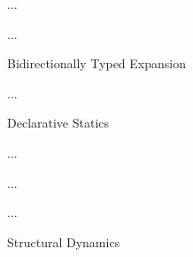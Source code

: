 \begin{figure}[h]
\judgbox{\expandSyn{\hGamma}{\hexp}{\dhexp}{\htau}{\Delta}}{ }
...

\judgbox{\expandAna{\hGamma}{\hexp}{\dhexp}{\htau}{\Delta}}{ }
...
\caption{Bidirectionally Typed Expansion}
\label{fig:expandSyn}
\label{fig:expandAna}
\end{figure}

\begin{figure}[h!]
...
\caption{Declarative Statics}
\label{fig:hasType}
\end{figure}

\begin{figure}[h!]
...

...

...
\caption{Structural Dynamics}
\label{fig:isValue}
\label{fig:isIndet}
\label{fig:stepsTo}
\end{figure}
